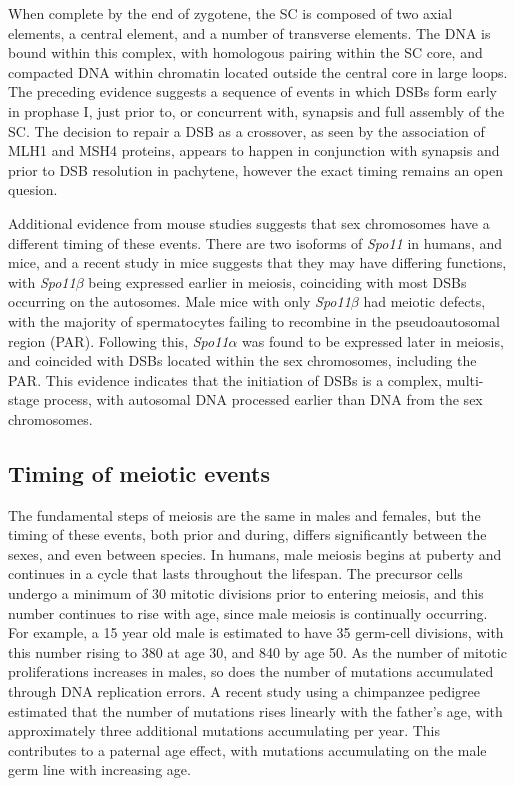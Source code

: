 When complete by the end of zygotene, the SC is composed of two axial elements, a central element, and a number of transverse elements\cite{Yang2009}.
The DNA is bound within this complex, with homologous pairing within the SC core, and compacted DNA within chromatin located outside the central core in large loops.
The preceding evidence suggests a sequence of events in which DSBs form early in prophase I, just prior to, or concurrent with, synapsis and full assembly of the SC.
The decision to repair a DSB as a crossover, as seen by the association of MLH1 and MSH4 proteins, appears to happen in conjunction with synapsis and prior to DSB resolution in pachytene, however the exact timing remains an open quesion\cite{Baudat2007}.

Additional evidence from mouse studies suggests that sex chromosomes have a different timing of these events.
There are two isoforms of \textit{Spo11} in humans, and mice, and a recent study in mice suggests that they may have differing functions, with \textit{Spo11$\beta$} being expressed earlier in meiosis, coinciding with most DSBs occurring on the autosomes.
Male mice with only \textit{Spo11$\beta$} had meiotic defects, with the majority of spermatocytes failing to recombine in the pseudoautosomal region (PAR)\cite{Kauppi2011}.
Following this, \textit{Spo11$\alpha$} was found to be expressed later in meiosis, and coincided with DSBs located within the sex chromosomes, including the PAR\cite{Kauppi2011,DeMassy2013}.
This evidence indicates that the initiation of DSBs is a complex, multi-stage process, with autosomal DNA processed earlier than DNA from the sex chromosomes.



\subsection{Timing of meiotic events}

The fundamental steps of meiosis are the same in males and females, but the timing of these events, both prior and during, differs significantly between the sexes\cite{Lynn2004}, and even between species.
In humans, male meiosis begins at puberty and continues in a cycle that lasts throughout the lifespan.
The precursor cells undergo a minimum of 30 mitotic divisions prior to entering meiosis, and this number continues to rise with age, since male meiosis is continually occurring.
For example, a 15 year old male is estimated to have 35 germ-cell divisions, with this number rising to 380 at age 30, and 840 by age 50\cite{Crow2000a}.
As the number of mitotic proliferations increases in males, so does the number of mutations accumulated through DNA replication errors.
A recent study using a chimpanzee pedigree estimated that the number of mutations rises linearly with the father's age, with approximately three additional mutations accumulating per year\cite{Venn2014}.
This contributes to a paternal age effect, with mutations accumulating on the male germ line with increasing age.

